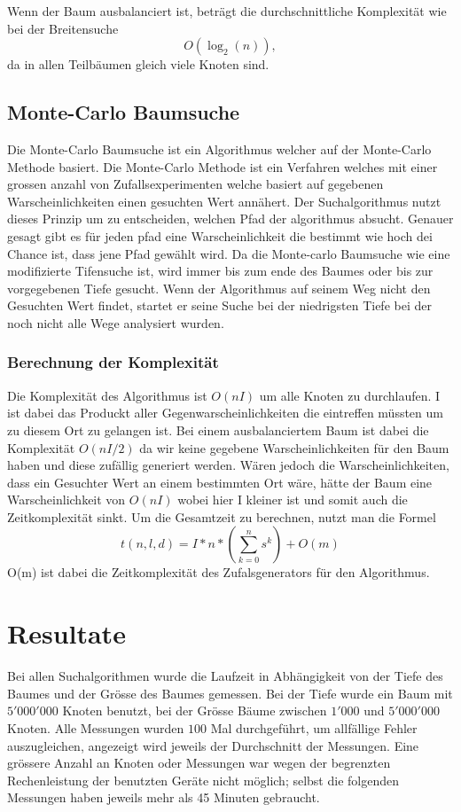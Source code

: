 \documentclass[a4paper,11pt]{article}
\begin{document}
Wenn der Baum ausbalanciert ist, beträgt die durchschnittliche Komplexität wie bei der Breitensuche $$O(\log_2(n)),$$ da in allen Teilbäumen gleich viele Knoten sind.

\subsection{Monte-Carlo Baumsuche}

Die Monte-Carlo Baumsuche ist ein Algorithmus welcher auf der Monte-Carlo Methode basiert. Die Monte-Carlo Methode ist ein Verfahren welches mit einer grossen anzahl von Zufallsexperimenten welche basiert auf gegebenen Warscheinlichkeiten einen gesuchten Wert annähert.
Der Suchalgorithmus nutzt dieses Prinzip um zu entscheiden, welchen Pfad der algorithmus absucht. Genauer gesagt gibt es für jeden pfad eine Warscheinlichkeit die bestimmt wie hoch dei Chance ist, dass jene Pfad gewählt wird. Da die Monte-carlo Baumsuche wie eine modifizierte Tifensuche ist, wird immer bis zum ende des Baumes oder bis zur vorgegebenen Tiefe gesucht. Wenn der Algorithmus auf seinem Weg nicht den Gesuchten Wert findet, startet er seine Suche bei der niedrigsten Tiefe bei der noch nicht alle Wege analysiert wurden. 

\subsubsection{Berechnung der Komplexität}

Die Komplexität des Algorithmus ist $O(nI)$ um alle Knoten zu durchlaufen. I ist dabei das Produckt aller Gegenwarscheinlichkeiten die eintreffen müssten um zu diesem Ort zu gelangen ist. Bei einem ausbalanciertem Baum ist dabei die Komplexität $O(nI/2)$ da wir keine gegebene Warscheinlichkeiten für den Baum haben und diese zufällig generiert werden. Wären jedoch die Warscheinlichkeiten, dass ein Gesuchter Wert an einem bestimmten Ort wäre, hätte der Baum eine Warscheinlichkeit von $O(nI)$ wobei hier I kleiner ist und somit auch die Zeitkomplexität sinkt. 
Um die Gesamtzeit zu berechnen, nutzt man die Formel $$ t(n,l,d) = I*n*(\sum_{k=0}^{n} s^k) + O(m)$$ O(m) ist dabei die Zeitkomplexität des Zufalsgenerators für den Algorithmus.

\section{Resultate}
Bei allen Suchalgorithmen wurde die Laufzeit in Abhängigkeit von der Tiefe des Baumes und der Grösse des Baumes gemessen. Bei der Tiefe wurde ein Baum mit $5'000'000$ Knoten benutzt, bei der Grösse Bäume zwischen $1'000$ und $5'000'000$ Knoten. Alle Messungen wurden $100$ Mal durchgeführt, um allfällige Fehler auszugleichen, angezeigt wird jeweils der Durchschnitt der Messungen. Eine grössere Anzahl an Knoten oder Messungen war wegen der begrenzten Rechenleistung der benutzten Geräte nicht möglich; selbst die folgenden Messungen haben jeweils mehr als 45 Minuten gebraucht.
\end{document}
